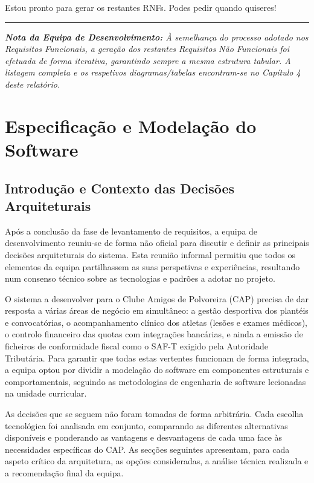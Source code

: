 \documentclass[a4paper,12pt]{scrreprt}
\begin{document}
{{Estou pronto para gerar os restantes RNFs. Podes pedir quando quiseres!

\vspace{0.3cm}
\hrule
\vspace{0.2cm}
\textit{\textbf{Nota da Equipa de Desenvolvimento:} À semelhança do processo adotado nos Requisitos Funcionais, a geração dos restantes Requisitos Não Funcionais foi efetuada de forma iterativa, garantindo sempre a mesma estrutura tabular. A listagem completa e os respetivos diagramas/tabelas encontram-se no Capítulo 4 deste relatório.}}



\chapter{Especificação e Modelação do Software}

\section{Introdução e Contexto das Decisões Arquiteturais}

Após a conclusão da fase de levantamento de requisitos, a equipa de desenvolvimento reuniu-se de forma não oficial para discutir e definir as principais decisões arquiteturais do sistema. Esta reunião informal permitiu que todos os elementos da equipa partilhassem as suas perspetivas e experiências, resultando num consenso técnico sobre as tecnologias e padrões a adotar no projeto.

O sistema a desenvolver para o Clube Amigos de Polvoreira (CAP) precisa de dar resposta a várias áreas de negócio em simultâneo: a gestão desportiva dos plantéis e convocatórias, o acompanhamento clínico dos atletas (lesões e exames médicos), o controlo financeiro das quotas com integrações bancárias, e ainda a emissão de ficheiros de conformidade fiscal como o SAF-T exigido pela Autoridade Tributária. Para garantir que todas estas vertentes funcionam de forma integrada, a equipa optou por dividir a modelação do software em componentes estruturais e comportamentais, seguindo as metodologias de engenharia de software lecionadas na unidade curricular.

As decisões que se seguem não foram tomadas de forma arbitrária. Cada escolha tecnológica foi analisada em conjunto, comparando as diferentes alternativas disponíveis e ponderando as vantagens e desvantagens de cada uma face às necessidades específicas do CAP. As secções seguintes apresentam, para cada aspeto crítico da arquitetura, as opções consideradas, a análise técnica realizada e a recomendação final da equipa.

}
\end{document}
